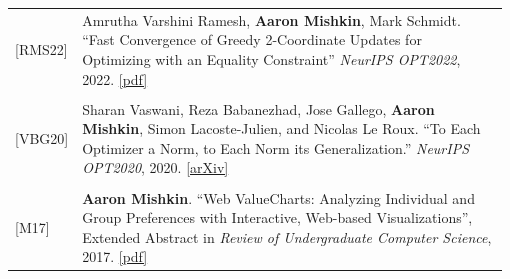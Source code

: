 \documentclass[10pt]{article}
\begin{document}
\begin{longtable}{C{0.1\linewidth} L{0.88\linewidth}}
                                                             [RMS22] & Amrutha Varshini Ramesh, \textbf{Aaron Mishkin}, Mark Schmidt.  ``Fast
                                                             Convergence of Greedy 2-Coordinate Updates for Optimizing with an Equality
                                                             Constraint'' \textit{NeurIPS OPT2022}, 2022.
                                                             \href{https://opt-ml.org/papers/2022/paper82.pdf}{[pdf]}
                                                             \\
                                                                                                                                                                                                    \\

                                                             [VBG20] & Sharan Vaswani, Reza Babanezhad, Jose Gallego, \textbf{Aaron Mishkin},
                                                             Simon Lacoste-Julien, and Nicolas Le Roux.  ``To Each Optimizer a Norm, to
                                                             Each Norm its Generalization.'' \textit{NeurIPS OPT2020}, 2020.
                                                             \href{https://arxiv.org/abs/2006.06821}{[arXiv]}
                                                             \\
                                                                                                                                                                                                    \\

                                                             [M17] & \textbf{Aaron Mishkin}. ``Web ValueCharts: Analyzing Individual and Group
                                                             Preferences with Interactive, Web-based Visualizations'', Extended Abstract
                                                             in \textit{Review of Undergraduate Computer Science}, 2017.
                                                             \href{https://www.cs.ubc.ca/~amishkin/amishkinVCExtendedAbstract.pdf}{[pdf]}
\end{longtable}
\vspace{-1ex}
\end{document}
